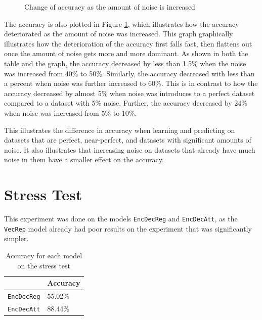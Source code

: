 \begin{figure}[H]
    \centering
    \captionsetup{justification=centering}
    \caption{Change of accuracy as the amount of noise is increased}
    \label{fig:noise_accuracy}
\end{figure}

The accuracy is also plotted in Figure \ref{fig:noise_accuracy}, which illustrates how the accuracy deteriorated as the amount of noise was increased. This graph graphically illustrates how the deterioration of the accuracy first falls fast, then flattens out once the amount of noise gets more and more dominant. As shown in both the table and the graph, the accuracy decreased by less than 1.5\% when the noise was increased from 40\% to 50\%. Similarly, the accuracy decreased with less than a percent when noise was further increased to 60\%. This is in contrast to how the accuracy decreased by almost 5\% when noise was introduces to a perfect dataset compared to a dataset with 5\% noise. Further, the accuracy decreased by 24\% when noise was increased from 5\% to 10\%.

This illustrates the difference in accuracy when learning and predicting on datasets that are perfect, near-perfect, and datasets with significant amounts of noise. It also illustrates that increasing noise on datasets that already have much noise in them have a smaller effect on the accuracy.


\section{Stress Test}
\label{sec:stress_test}
This experiment was done on the models {\tt EncDecReg} and {\tt EncDecAtt}, as the {\tt VecRep} model already had poor results on the experiment that was significantly simpler.

\begin{table}[H]
    \centering
    \begin{tabular}{|l|l|}
        \hline 
                                        & \textbf{Accuracy}         \\ \hline
        {\tt EncDecReg}                 & 55.02\%                   \\ \hline
        {\tt EncDecAtt}                 & 88.44\%                   \\ \hline
    \end{tabular}
    \caption{Accuracy for each model on the stress test}
    \label{table:accuracy_stress_test}
\end{table}

